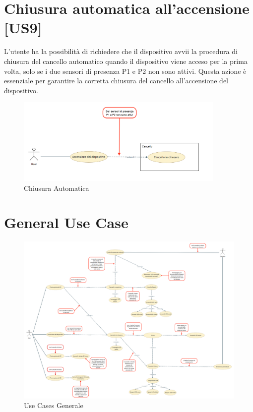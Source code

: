 \section{Chiusura automatica all'accensione [US9]}
L'utente ha la possibilità di richiedere che il dispositivo avvii la procedura di chiusura del cancello automatico quando il dispositivo viene acceso per la prima volta, solo se i due sensori di presenza P1 e P2 non sono attivi.
Questa azione è essenziale per garantire la corretta chiusura del cancello all'accensione del dispositivo.

\begin{figure}[H]
    \centering
    \includegraphics[width=0.9\textwidth]{figures/usecase_9.png}
    \caption{Chiusura Automatica}
    \label{usecase9}
\end{figure}


\section{General Use Case}
\begin{figure}[H]
    \centering
    \includegraphics[width=1\linewidth]{figures/generalusecases.png}
    \caption{Use Cases Generale}
    \label{general}
\end{figure}